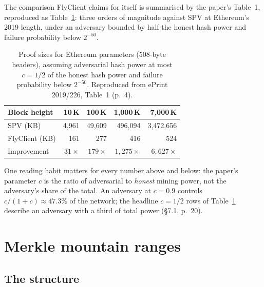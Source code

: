 \documentclass[11pt,a4paper]{article}
\theoremstyle{definition}
\begin{document}
The comparison FlyClient claims for itself is summarised by the paper's
Table~1, reproduced as Table~\ref{tab:fc-sizes}: three orders of magnitude
against SPV at Ethereum's 2019 length, under an adversary bounded by half
the honest hash power and failure probability below $2^{-50}$.

\begin{table}[htbp]
\centering
\small
\begin{tabular}{@{}lrrrr@{}}
\toprule
Block height & 10\,K & 100\,K & 1{,}000\,K & 7{,}000\,K \\
\midrule
SPV (KB) & 4{,}961 & 49{,}609 & 496{,}094 & 3{,}472{,}656 \\
FlyClient (KB) & 161 & 277 & 416 & 524 \\
\addlinespace
Improvement & $31\times$ & $179\times$ & $1{,}275\times$ & $6{,}627\times$ \\
\bottomrule
\end{tabular}
\caption{Proof sizes for Ethereum parameters (508-byte headers), assuming
adversarial hash power at most $c = 1/2$ of the honest hash power and
failure probability below $2^{-50}$. Reproduced from ePrint 2019/226,
Table~1 (p.~4).}
\label{tab:fc-sizes}
\end{table}

One reading habit matters for every number above and below: the paper's
parameter $c$ is the ratio of adversarial to \emph{honest} mining power, not
the adversary's share of the total. An adversary at $c = 0.9$ controls
$c/(1+c) \approx 47.3\%$ of the network; the headline $c = 1/2$ rows of
Table~\ref{tab:fc-sizes} describe an adversary with a third of total power
(\S7.1, p.~20).

\section{Merkle mountain ranges}\label{sec:fc-mmr}

\subsection{The structure}\label{sec:fc-mmr-def}
\end{document}
